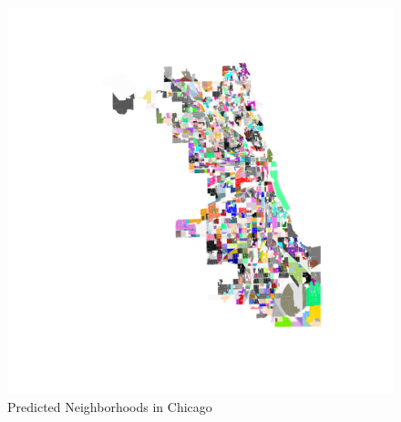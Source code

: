 \documentclass[12pt,letter]{article}\usepackage[]{graphicx}\usepackage[]{color}
\begin{document}
\begin{figure}
\includegraphics{../code/training/predicted_chicago_neighborhoods.pdf}
\caption{Predicted Neighborhoods in Chicago}
\end{figure}
\end{document}
